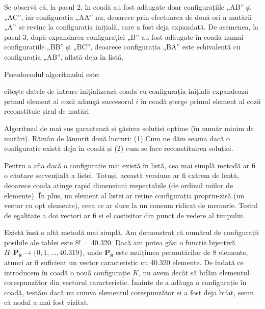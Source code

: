 Se observă că, la pasul 2, în coadă au fost adăugate doar configurațiile „AB”
și „AC”, iar configurația „AA” nu, deoarece prin efectuarea de două ori a
mutării „A” se revine la configurația inițială, care a fost deja expandată. De
asemenea, la pasul 3, după expandarea configurației „B” au fost adăugate în
coadă numai configurațiile „BB” și „BC”, deoarece configurația „BA” este
echivalentă cu configurația „AB”, aflată deja în listă.

Pseudocodul algoritmului este:

\vspace{\algskip}
\begin{algorithmic}[1]
  \STATE citește datele de intrare
  \STATE inițializează coada cu configurația inițială
  \STATE expandează primul element al cozii
  \STATE adaugă succesorul $i$ în coadă
  \ENDIF
  \ENDFOR
  \STATE șterge primul element al cozii
  \ENDWHILE
  \STATE reconstituie șirul de mutări
\end{algorithmic}

Algoritmul de mai sus garantează și găsirea soluției optime (în număr minim de
mutări). Rămân de lămurit două lucruri: (1) Cum ne dăm seama dacă o
configurație există deja în coadă și (2) cum se face reconstituirea soluției.

Pentru a afla dacă o configurație mai există în listă, cea mai simplă metodă
ar fi o căutare secvențială a listei. Totuși, această versiune ar fi extrem de
lentă, deoarece coada atinge rapid dimensiuni respectabile (de ordinul miilor
de elemente). În plus, un element al listei ar reține configurația
propriu-zisă (un vector cu opt elemente), ceea ce ar duce la un consum ridicat
de memorie. Testul de egalitate a doi vectori ar fi și el costisitor din punct
de vedere al timpului.

Există însă o altă metodă mai simplă. Am demonstrat că numărul de configurații
posibile ale tablei este 8! = 40.320.  Dacă am putea găsi o funcție bijectivă
$H: \mathbf{P_8} \to \{0, 1, \dots, 40.319\}$, unde $\mathbf{P_8}$ este
mulțimea permutărilor de 8 elemente, atunci ar fi suficient un vector
caracteristic cu 40.320 elemente. De îndată ce introducem în coadă o nouă
configurație $K$, nu avem decât să bifăm elementul corespunzător din vectorul
caracteristic. Înainte de a adăuga o configurație în coadă, testăm dacă nu
cumva elementul corespunzător ei a fost deja bifat, semn că nodul a mai fost
vizitat.

